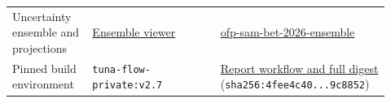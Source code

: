 \documentclass[
  english,
  a4paper,
  a4paper,
  11pt]{SCreport}
\providecommand{\DIFaddbegin}{} %
\providecommand{\DIFaddend}{} %
\providecommand{\DIFdelbegin}{} %
\providecommand{\DIFdelend}{} %
\newcommand{\DIFscaledelfig}{0.5}
\newlength{\DIFdelgraphicswidth} %
\newlength{\DIFdelgraphicsheight} %
\newcommand{\DIFaddincludegraphics}[2][]{{\color{blue}\fbox{\DIFOincludegraphics[#1]{#2}}}} %
\newcommand{\DIFdelincludegraphics}[2][]{%
\sbox{\DIFdelgraphicsbox}{\DIFOincludegraphics[#1]{#2}}%
\settoboxwidth{\DIFdelgraphicswidth}{\DIFdelgraphicsbox} %
\settoboxtotalheight{\DIFdelgraphicsheight}{\DIFdelgraphicsbox} %
\scalebox{\DIFscaledelfig}{%
\parbox[b]{\DIFdelgraphicswidth}{\usebox{\DIFdelgraphicsbox}\\[-\baselineskip] \rule{\DIFdelgraphicswidth}{0em}}\llap{\resizebox{\DIFdelgraphicswidth}{\DIFdelgraphicsheight}{%
\setlength{\unitlength}{\DIFdelgraphicswidth}%
\begin{picture}(1,1)%
\thicklines\linethickness{2pt} %
{\color[rgb]{1,0,0}\put(0,0){\framebox(1,1){}}}%
{\color[rgb]{1,0,0}\put(0,0){\line( 1,1){1}}}%
{\color[rgb]{1,0,0}\put(0,1){\line(1,-1){1}}}%
\end{picture}%
}\hspace*{3pt}}} %
} %
\DeclareRobustCommand{\DIFaddbegin}{\DIFOaddbegin \let\includegraphics\DIFaddincludegraphics} %
\DeclareRobustCommand{\DIFaddend}{\DIFOaddend \let\includegraphics\DIFOincludegraphics} %
\DeclareRobustCommand{\DIFdelbegin}{\DIFOdelbegin \let\includegraphics\DIFdelincludegraphics} %
\DeclareRobustCommand{\DIFdelend}{\DIFOaddend \let\includegraphics\DIFOincludegraphics} %
\begin{document}
\begin{longtable}{@{}>{\raggedright\arraybackslash}p{0.20\linewidth}>{\raggedright\arraybackslash}p{0.32\linewidth}>{\raggedright\arraybackslash}p{0.40\linewidth}@{}}
Uncertainty ensemble and projections & \href{https://pacificcommunity.github.io/ofp-sam-bet-2026-ensemble/bet-2026-ensemble-interactive-viewer.html}{Ensemble viewer} & \href{https://github.com/PacificCommunity/ofp-sam-bet-2026-ensemble}{ofp-sam-bet-2026-ensemble} \\
Pinned build environment & \texttt{tuna-flow-private:v2.7} & \href{https://github.com/PacificCommunity/ofp-sam-bet-2026-report/blob/rev1/.github/workflows/render-quarto.yml}{Report workflow and full digest} (\texttt{sha256:4fee4c40...9c8852}) \\

\end{longtable}

\endgroup

\DIFaddend \clearpage

\DIFaddbegin \begin{landscape}
\DIFaddend \begingroup
\DIFdelbegin %
\DIFdelend \DIFaddbegin \fontsize{6.8}{7.2}\selectfont
\DIFaddend \setlength{\tabcolsep}{3pt}
\DIFdelbegin %
\DIFdelend \DIFaddbegin \renewcommand{\arraystretch}{0.94}
\DIFaddend 


\end{landscape}
\end{document}
